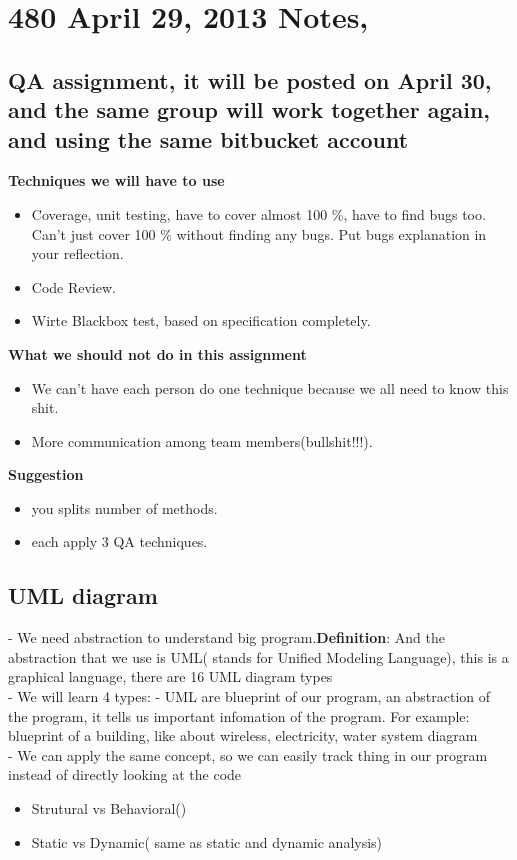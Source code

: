 \documentclass{article}
\begin{document}
\section{480 April 29, 2013 Notes, }

\subsection{QA assignment, it will be posted on April 30, and the same group
will work together again, and using the same bitbucket account}
\textbf{Techniques we will have to use}
\begin{itemize}
  \item Coverage, unit testing, have to cover almost 100 \%, have to find bugs
  too. Can't just cover 100 \% without finding any bugs. Put bugs explanation in
  your reflection.
  \item Code Review.
  \item Wirte Blackbox test,  based on specification completely.
\end{itemize}
\textbf{ What we should not do in this assignment}
\begin{itemize}
  \item We can't have each person do one technique because we all need to know
  this shit.
  \item More communication among team members(bullshit!!!).
\end{itemize}

\textbf{Suggestion}
\begin{itemize}
  \item you splits number of methods.
  \item each apply 3 QA techniques.
\end{itemize}


\subsection{UML diagram}
- We need abstraction to understand big program.\textbf{Definition}: And the
abstraction that we use is UML( stands for Unified Modeling Language), this is a graphical language,
there are 16 UML diagram types\\
- We will learn 4 types:
- UML are blueprint of our program, an abstraction of the program, it tells us
important infomation of the program. For example: blueprint of a building, like
about wireless, electricity, water system diagram\\
- We can apply the same concept, so we can easily track thing in our program
instead of directly looking at the code\\
\begin{itemize}
  \item Strutural vs Behavioral()
  \item Static vs Dynamic( same as static and dynamic analysis)
\end{itemize}
\end{document}

